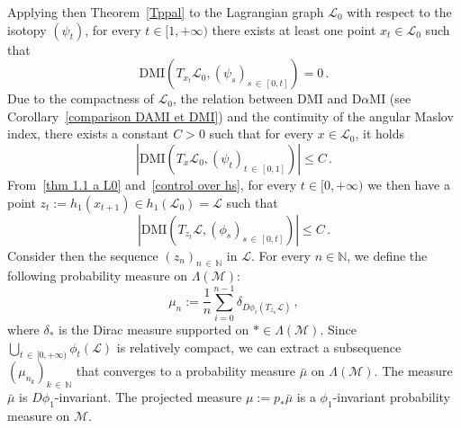 \documentclass[AHL, Unicode, longabstracts, published]{cedram}
\newcommand*\M{\mathcal{M}}
\newcommand*\cl{\mathcal{L}}
\newcommand{\DMI}{\mathrm{DMI}}
\newcommand{\MI}{\mathrm{MI}}
\newcommand{\rmD}{\mathrm{D}}
\newcommand*\N{\mathbb{N}}
\begin{document}
Applying then Theorem~\ref{Tppal} to the Lagrangian graph $\cl_0$ with respect to the isotopy $(\psi_t) $, for every $t\in[1,+\infty)$ there exists at least one point $x_t\in\cl_0$ such that
\begin{equation}\label{thm 1.1 a L0}
\DMI\left(T_{x_t}\cl_0, (\psi_s)_{s\,\in\,[0,t]}\right)=0\,.
\end{equation}
Due to the compactness of $\cl_0$, the relation between $\DMI$ and $\rmD\alpha\MI$ (see { Corollary}~\ref{comparison DAMI et DMI}) and the continuity of the angular Maslov index, there exists a constant $C>0$ such that for every $x\in\cl_0$, it holds
\begin{equation}\label{control over hs}
\left\vert \DMI\left(T_x\cl_0, (\psi_t)_{t\,\in\,[0,1]}\right)\right\vert \leq C\,.
\end{equation}
From~\eqref{thm 1.1 a L0} and~\eqref{control over hs}, for every $t\in[0,+\infty)$ we then have a point $z_t:= h_1(x_{t+1})\in h_1(\cl_0)=\cl$ such that
\begin{equation}\label{control over phis}
\left\vert \DMI\left(T_{z_t}\cl, (\phi_s)_{s\,\in\,[0,t]}\right)\right\vert \leq C\,.
\end{equation}
Consider then the sequence $(z_n)_{n\,\in\,\N}$ in $\cl$. For every $n\in\N$, we define the following probability measure on $\Lambda(\M)$:
\[
\mu_n := \dfrac{1}{n}\sum_{i=0}^{n-1} \delta_{D\phi_i(T_{z_n}\cl)}\,,
\]
where $\delta_*$ is the Dirac measure supported on $*\in\Lambda(\M)$. Since $\bigcup_{t\,\in\,[0,+\infty)}\phi_t(\cl)$ is relatively compact, we can extract a subsequence $(\mu_{n_k})_{k\,\in\,\N}$ that converges to a probability measure $\bar\mu$ on $\Lambda(\M)$. The measure $\bar\mu$ is $D\phi_1$-invariant. The projected measure $\mu:=p_*\bar\mu$ is a $\phi_1$-invariant probability measure on $\M$.
\end{document}
